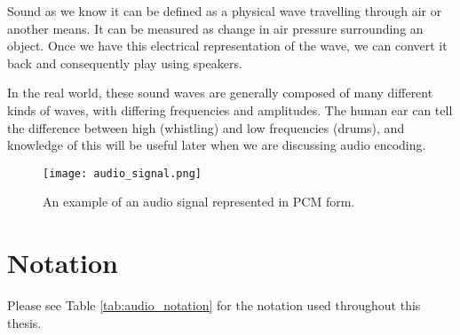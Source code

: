 Sound as we know it can be defined as a physical wave travelling through air or another means. \cite{you_2010} It can be measured as change in air pressure surrounding an object. Once we have this electrical representation of the wave, we can convert it back and consequently play using speakers.

In the real world, these sound waves are generally composed of many different kinds of waves, with differing frequencies and amplitudes. The human ear can tell the difference between high (whistling) and low frequencies (drums), and knowledge of this will be useful later when we are discussing audio encoding.

\begin{figure}[ht]
	\caption[Example audio signal]{An example of an audio signal represented in PCM form.}
	\label{fig:audio_signal}
	\centering
	\texttt{[image: audio\_signal.png]}
\end{figure}

\section{Notation}
Please see Table \ref{tab:audio_notation} for the notation used throughout this thesis.

